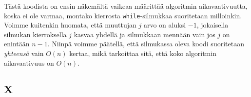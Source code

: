 Tästä koodista on ensin näkemältä vaikeaa määrittää algoritmin
aikavaativuutta, koska ei ole varmaa, montako kierrosta
\texttt{while}-silmukkaa suoritetaan milloinkin.
Voimme kuitenkin huomata, että muuttujan $j$ arvo on aluksi $-1$,
jokaisella silmukan kierroksella $j$ kasvaa yhdellä
ja silmukkaan mennään vain jos $j$ on enintään $n-1$.
Niinpä voimme päätellä, että silmukassa oleva koodi suoritetaan \emph{yhteensä}
vain $O(n)$ kertaa, mikä tarkoittaa sitä,
että koko algoritmin aikavaativuus on $O(n)$.

\subsection{X}


% 
% 
% 
% 
% 
% 
% 
% 

